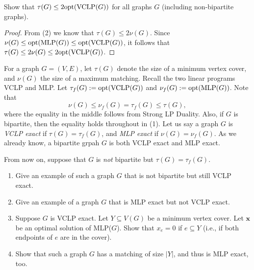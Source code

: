     \begin{thm}{}{}
        Show that $\tau(G) \leq 2{\rm opt}({\rm VCLP}(G))$ for all graphs $G$ (including non-bipartite graphs).
    \end{thm}

    \begin{proof}
        From (2) we know that $\tau(G) \leq 2\nu(G)$. Since $\nu(G) \leq {\rm opt}({\rm MLP}(G)) \leq {\rm opt}({\rm VCLP}(G))$, it follows that $\tau(G) \leq 2\nu(G) \leq 2{\rm opt}({\rm VCLP}(G))$.
    \end{proof}

    \begin{thm}{}{}
        For a graph $G = (V, E)$, let $\tau(G)$ denote the size of a minimum vertex cover, and $\nu(G)$ the size of a maximum matching. Recall the two linear programs VCLP and MLP. Let $\tau_f(G) := {\rm opt}({\rm VCLP}(G))$ and $\nu_f(G) := {\rm opt}({\rm MLP}(G))$. Note that
        $$
        \nu(G) \leq \nu_f(G) = \tau_f(G) \leq \tau(G),
        $$
        where the equality in the middle follows from Strong LP Duality. Also, if $G$ is bipartite, then the equality holds throughout in (1). Let us say a graph $G$ is {\it VCLP exact} if $\tau(G) = \tau_f(G)$, and {\it MLP exact} if $\nu(G) = \nu_f(G)$. As we already know, a bipartite grpah $G$ is both VCLP exact and MLP exact.
        
        From now on, suppose that $G$ is {\it not} bipartite but $\tau(G) = \tau_f(G)$.
        
        \begin{enumerate}
            \item Give an example of such a graph $G$ that is not bipartite but still VCLP exact.
            \item Give an example of a graph $G$ that is MLP exact but not VCLP exact.
            \item Suppose $G$ is VCLP exact. Let $Y \subseteq V(G)$ be a minimum vertex cover. Let $\mathbf{x}$ be an optimal solution of MLP($G$). Show that $x_e = 0$ if $e \subseteq Y$ (i.e., if both endpoints of $e$ are in the cover).
            \item Show that such a graph $G$ has a matching of size $|Y|$, and thus is MLP exact, too.
        \end{enumerate}
    \end{thm}

